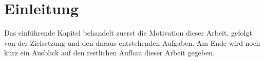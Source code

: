 \chapter{Einleitung}
Das einführende Kapitel behandelt zuerst die Motivation dieser Arbeit, gefolgt von
der Zielsetzung und den daraus entstehenden Aufgaben. Am Ende wird noch kurz ein
Ausblick auf den restlichen Aufbau dieser Arbeit gegeben.





